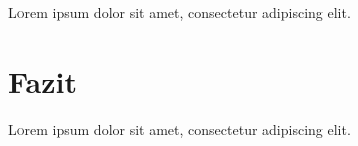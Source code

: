 \documentclass[twoside,twocolumn]{article}
\begin{document}
\lettrine[nindent=0em,lines=3]{L} orem ipsum dolor sit amet, consectetur adipiscing elit.
\blindtext %


\section{Fazit}

\lettrine[nindent=0em,lines=3]{L} orem ipsum dolor sit amet, consectetur adipiscing elit.
\blindtext %


\renewcommand{\refname}{Quellenverzeichnis}



\end{document}
